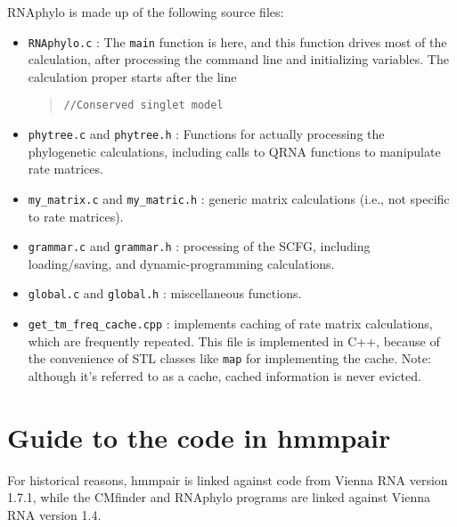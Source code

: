\documentclass[letterpaper,12pt]{report}
\begin{document}
RNAphylo is made up of the following source files:
\begin{itemize}
\item {\tt RNAphylo.c} : The {\tt main} function is here, and this function drives most of the calculation, after processing the command line and initializing variables.  The calculation proper starts after the line
\begin{quote}
{\tt //Conserved singlet model}
\end{quote}
\item {\tt phytree.c} and {\tt phytree.h} : Functions for actually processing the phylogenetic calculations, including calls to QRNA functions to manipulate rate matrices.
\item {\tt my\_matrix.c} and {\tt my\_matric.h} : generic matrix calculations (i.e., not specific to rate matrices).
\item {\tt grammar.c} and {\tt grammar.h} : processing of the SCFG, including loading/saving, and dynamic-programming calculations.
\item {\tt global.c} and {\tt global.h} : miscellaneous functions.
\item {\tt get\_tm\_freq\_cache.cpp} : implements caching of rate matrix calculations, which are frequently repeated.  This file is implemented in C++, because of the convenience of STL classes like {\tt map} for implementing the cache.  Note: although it's referred to as a cache, cached information is never evicted.
\end{itemize}

\section{Guide to the code in hmmpair}

For historical reasons, hmmpair is linked against code from Vienna RNA version 1.7.1, while the CMfinder and RNAphylo programs are linked against Vienna RNA version 1.4.
\end{document}
